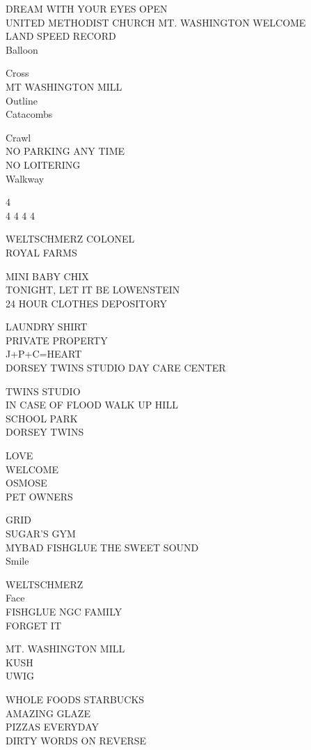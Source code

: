\documentclass[10pt,letterpaper]{article}
\begin{document}
DREAM WITH YOUR EYES OPEN\\
UNITED METHODIST CHURCH MT. WASHINGTON WELCOME\\
LAND SPEED RECORD\\
Balloon

Cross\\
MT WASHINGTON MILL\\
Outline\\
Catacombs

Crawl\\
NO PARKING ANY TIME\\
NO LOITERING\\
Walkway

4\\
4 4 4 4

WELTSCHMERZ COLONEL\\
ROYAL FARMS

MINI BABY CHIX\\
TONIGHT, LET IT BE LOWENSTEIN\\
24 HOUR CLOTHES DEPOSITORY

LAUNDRY SHIRT\\
PRIVATE PROPERTY\\
J+P+C=HEART\\
DORSEY TWINS STUDIO DAY CARE CENTER

TWINS STUDIO\\
IN CASE OF FLOOD WALK UP HILL\\
SCHOOL PARK\\
DORSEY TWINS

LOVE\\
WELCOME\\
OSMOSE\\
PET OWNERS

GRID\\
SUGAR'S GYM\\
MYBAD FISHGLUE THE SWEET SOUND\\
Smile

WELTSCHMERZ\\
Face\\
FISHGLUE NGC FAMILY\\
FORGET IT

MT. WASHINGTON MILL\\
KUSH\\
UWIG

WHOLE FOODS STARBUCKS\\
AMAZING GLAZE\\
PIZZAS EVERYDAY\\
DIRTY WORDS ON REVERSE
\end{document}
